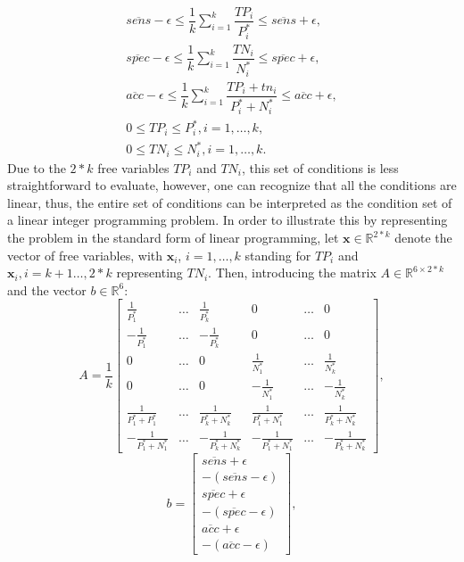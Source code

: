 \documentclass[5p, final]{elsarticle}
\begin{document}
\begin{align}
\overline{sens} - \epsilon \leq \dfrac{1}{k}\sum\limits_{i=1}^{k}\dfrac{TP_i}{P_i^*} \leq \overline{sens} + \epsilon, \label{cond-sens}\\
\overline{spec} - \epsilon \leq \dfrac{1}{k}\sum\limits_{i=1}^{k}\dfrac{TN_i}{N_i^*} \leq \overline{spec} + \epsilon, \label{cond-spec}\\
\overline{acc} - \epsilon \leq \dfrac{1}{k}\sum\limits_{i=1}^{k}\dfrac{TP_i + tn_i}{P_i^* + N_i^*} \leq \overline{acc} + \epsilon, \label{cond-acc}\\
0 \leq TP_i \leq P_i^*, i=1, \dots, k, \label{boundary-tp}\\
0 \leq TN_i \leq N_i^*, i=1, \dots, k. \label{boundary-tn}
\end{align}
Due to the $2*k$ free variables $TP_i$ and $TN_i$, this set of conditions is less straightforward to evaluate, however, one can recognize that all the conditions are linear, thus, the entire set of conditions can be interpreted as the condition set of a linear integer programming problem. In order to illustrate this by representing the problem in the standard form of linear programming, let $\mathbf{x}\in\mathbb{R}^{2*k}$ denote the vector of free variables, with $\mathbf{x}_i$, $i=1,\dots,k$ standing for $TP_i$ and $\mathbf{x}_i, i=k+1\dots,2*k$ representing $TN_i$. Then, introducing the matrix $A\in\mathbb{R}^{6\times 2*k}$ and the vector $b\in\mathbb{R}^{6}$:
\begin{equation}
A= \dfrac{1}{k}\left[\begin{array}{cccccc}
\frac{1}{P_1^*} & \dots & \frac{1}{P_{k}^*} & 0 & \dots & 0 \\
-\frac{1}{P_1^*} & \dots & -\frac{1}{P_{k}^*} & 0 & \dots & 0 \\
0 & \dots & 0 & \frac{1}{N_1^*} & \dots & \frac{1}{N_{k}^*}\\
0 & \dots & 0 & -\frac{1}{N_1^*} & \dots & -\frac{1}{N_{k}^*}\\
\frac{1}{P_1^* + P_1^*} & \dots & \frac{1}{P_{k}^* + N_{k}^*} & \frac{1}{P_1^* + N_1^*} & \dots & \frac{1}{P_{k}^* + N_{k}^*} \\
-\frac{1}{P_1^* + N_1^*} & \dots & -\frac{1}{P_{k}^* + N_{k}^*} & -\frac{1}{P_1^* + N_1^*} & \dots & -\frac{1}{P_{k}^* + N_{k}^*}
\end{array}\right],
\end{equation}
\begin{equation}
b= \left[\begin{array}{c}\overline{sens} + \epsilon \\
-(\overline{sens} - \epsilon) \\
\overline{spec} + \epsilon \\
-(\overline{spec} - \epsilon) \\
\overline{acc} + \epsilon \\
-(\overline{acc} - \epsilon)
\end{array}\right],
\end{equation}
\end{document}
